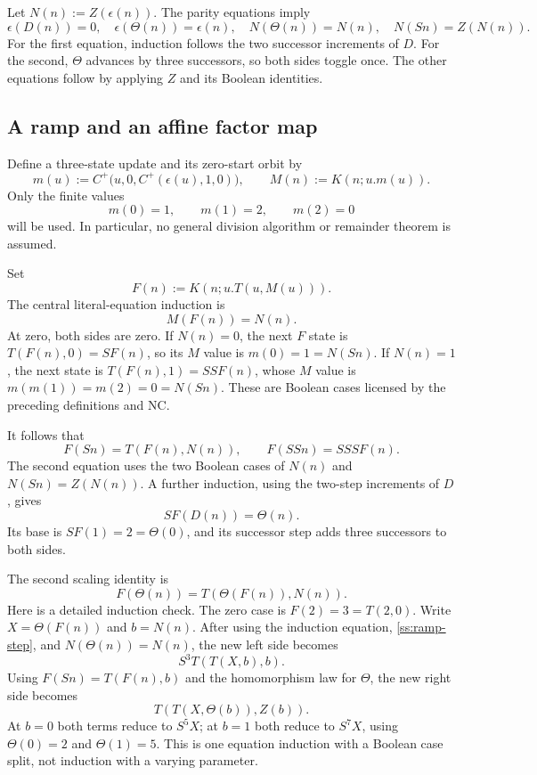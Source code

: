 Let $N(n):=Z(\epsilon(n))$.  The parity equations imply
\begin{equation}
 \epsilon(D(n))=0,\quad
 \epsilon(\Theta(n))=\epsilon(n),\quad
 N(\Theta(n))=N(n),\quad N(Sn)=Z(N(n)).
 \label{ss:affine-parity}
\end{equation}
For the first equation, induction follows the two successor increments
of $D$.  For the second, $\Theta$ advances by three successors, so both
sides toggle once.  The other equations follow by applying $Z$ and its
Boolean identities.

\subsection{A ramp and an affine factor map}

Define a three-state update and its zero-start orbit by
\[
 m(u):=C^+\bigl(u,0,C^+(\epsilon(u),1,0)\bigr),\qquad
 M(n):=K(n;u.m(u)).
\]
Only the finite values
\[
 m(0)=1,\qquad m(1)=2,\qquad m(2)=0
\]
will be used.  In particular, no general division algorithm or
remainder theorem is assumed.

Set
\[
 F(n):=K(n;u.T(u,M(u))).
\]
The central literal-equation induction is
\begin{equation}
                          M(F(n))=N(n).
 \label{ss:ramp-invariant}
\end{equation}
At zero, both sides are zero.  If $N(n)=0$, the next $F$ state is
$T(F(n),0)=SF(n)$, so its $M$ value is $m(0)=1=N(Sn)$.
If $N(n)=1$, the next state is $T(F(n),1)=SSF(n)$, whose $M$ value
is $m(m(1))=m(2)=0=N(Sn)$.  These are Boolean cases licensed by
the preceding definitions and NC.

It follows that
\begin{equation}
 F(Sn)=T(F(n),N(n)),\qquad F(SSn)=SSSF(n).
 \label{ss:ramp-step}
\end{equation}
The second equation uses the two Boolean cases of $N(n)$ and
$N(Sn)=Z(N(n))$.  A further induction, using the two-step increments
of $D$, gives
\begin{equation}
                          S F(D(n))=\Theta(n).
 \label{ss:ramp-double}
\end{equation}
Its base is $S F(1)=2=\Theta(0)$, and its successor step adds three
successors to both sides.

The second scaling identity is
\begin{equation}
 F(\Theta(n))=T(\Theta(F(n)),N(n)).
 \label{ss:ramp-triple}
\end{equation}
Here is a detailed induction check.  The zero case is $F(2)=3=T(2,0)$.
Write $X=\Theta(F(n))$ and $b=N(n)$.  After using the induction
equation, \eqref{ss:ramp-step}, and
$N(\Theta(n))=N(n)$, the new left side becomes
\[
                      S^3T(T(X,b),b).
\]
Using $F(Sn)=T(F(n),b)$ and the homomorphism law for $\Theta$, the
new right side becomes
\[
                    T(T(X,\Theta(b)),Z(b)).
\]
At $b=0$ both terms reduce to $S^5X$; at $b=1$ both reduce to $S^7X$,
using $\Theta(0)=2$ and $\Theta(1)=5$.  This is one equation induction
with a Boolean case split, not induction with a varying parameter.


